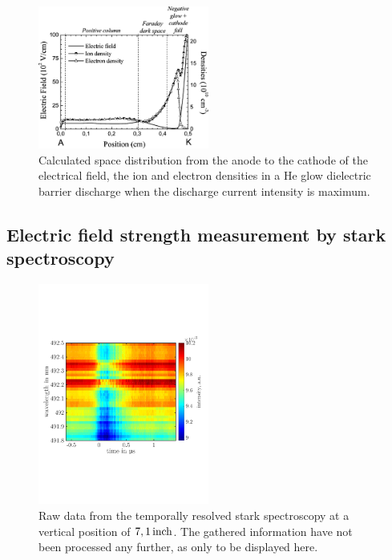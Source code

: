 \documentclass[a4paper,10pt,twoside]{article}
\begin{document}
				
				\begin{figure}
					\centering
					\includegraphics[width=0.5\textwidth]{figures/lineratio/massinesp3fig5.pdf}
					\caption{Calculated space distribution from the anode to the cathode of	the electrical field, the ion and electron densities in a He glow dielectric barrier discharge when the discharge current intensity is maximum. \cite{Massines}}
					\label{img:massines}
				\end{figure}
		
		\subsection{Electric field strength measurement by stark spectroscopy}
		
				\begin{figure}
					\centering
					\includegraphics[width=0.5\textwidth]{figures/stark/stark_71inraw.pdf}
					\caption{Raw data from the temporally resolved stark spectroscopy at a vertical position of $\unit[7,1]{inch}$. The gathered information have not been processed any further, as only to be displayed here.}
				\end{figure}
\end{document}
